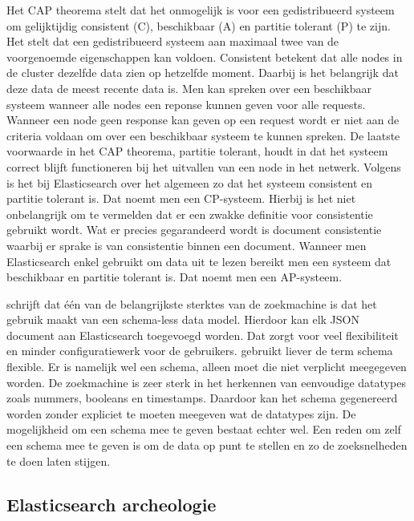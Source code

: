Het CAP theorema stelt dat het onmogelijk is voor een gedistribueerd systeem om gelijktijdig consistent (C), beschikbaar (A) en partitie tolerant (P) te zijn. Het stelt dat een gedistribueerd systeem aan maximaal twee van de voorgenoemde eigenschappen kan voldoen. Consistent betekent dat alle nodes in de cluster dezelfde data zien op hetzelfde moment. Daarbij is het belangrijk dat deze data de meest recente data is. Men kan spreken over een beschikbaar systeem wanneer alle nodes een reponse kunnen geven voor alle requests. Wanneer een node geen response kan geven op een request wordt er niet aan de criteria voldaan om over een beschikbaar systeem te kunnen spreken. De laatste voorwaarde in het CAP theorema, partitie tolerant, houdt in dat het systeem correct blijft functioneren bij het uitvallen van een node in het netwerk. Volgens \textcite{Brasetvik2013} is het bij Elasticsearch over het algemeen zo dat het systeem consistent en partitie tolerant is. Dat noemt men een CP-systeem. Hierbij is het niet onbelangrijk om te vermelden dat er een zwakke definitie voor consistentie gebruikt wordt. Wat er precies gegarandeerd wordt is document consistentie waarbij er sprake is van consistentie binnen een document. Wanneer men Elasticsearch enkel gebruikt om data uit te lezen bereikt men een systeem dat beschikbaar en partitie tolerant is. Dat noemt men een AP-systeem.

\textcite{Glauner2012} schrijft dat één van de belangrijkste sterktes van de zoekmachine is dat het gebruik maakt van een schema-less data model. Hierdoor kan elk JSON document aan Elasticsearch toegevoegd worden. Dat zorgt voor veel flexibiliteit en minder configuratiewerk voor de gebruikers. \textcite{Brasetvik2013} gebruikt liever de term schema flexible. Er is namelijk wel een schema, alleen moet die niet verplicht meegegeven worden. De zoekmachine is zeer sterk in het herkennen van eenvoudige datatypes zoals nummers, booleans en timestamps. Daardoor kan het schema gegenereerd worden zonder expliciet te moeten meegeven wat de datatypes zijn. De mogelijkheid om een schema mee te geven bestaat echter wel. Een reden om zelf een schema mee te geven is om de data op punt te stellen en zo de zoeksnelheden te doen laten stijgen.

\subsection{Elasticsearch archeologie}

